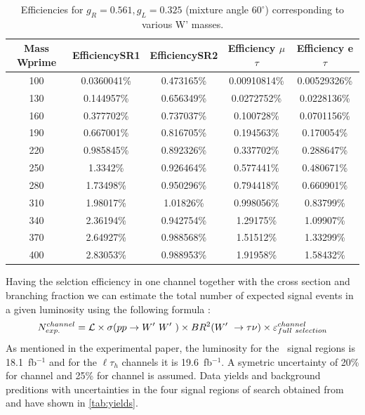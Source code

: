  \begin{table}[htb]
 	\centering
  	\begin{tabular}{|ccccc|}
  		\hline 
  		Mass Wprime & EfficiencySR1 & EfficiencySR2 & Efficiency $\mu$$\tau$ & Efficiency e $\tau$ \\
\hline 
  		100&0.0360041\%&0.473165\%&0.00910814\%&0.00529326\%\\
        	130& 0.144957\%& 0.656349\%&0.0272752\%& 0.0228136\%\\
        	160&0.377702\%&0.737037\%&0.100728\%&0.0701156\%\\
          	190& 0.667001\%& 0.816705\%& 0.194563\%& 0.170054\%\\
                220&0.985845\%&0.892326\%&0.337702\%&0.288647\%\\
                250&1.3342\%&0.926464\%&0.577441\%&0.480671\%\\ 
          	280& 1.73498\%& 0.950296\%& 0.794418\%& 0.660901\%\\
                310&1.98017\%&1.01826\%&0.998056\%&0.83799\%\\
                340& 2.36194\%& 0.942754\%& 1.29175\%& 1.09907\%\\ 
                370& 2.64927\%& 0.988568\%& 1.51512\%& 1.33299\%\\
        	400&2.83053\%&0.988953\%&1.91958\%&1.58432\%\\

  		\hline
  	\end{tabular}
  	\caption{Efficiencies for  $ g_R=0.561 , g_L=0.325$  (mixture angle $60^\circ$) corresponding to various W' masses. \label{eff-mix60} }
  \end{table}


 
Having the selction efficiency in one channel together with the cross section and branching fraction we can estimate the total number of expected signal events in a given luminosity using the following formula :
\begin{equation}
N^{channel}_{exp.}= \mathcal{L} \times \sigma(pp \to W^\prime~W^\prime~) \times BR^{2}(W^\prime~ \to \tau \nu) \times \varepsilon^{channel}_{full~selection}
\end{equation}
As mentioned in the experimental paper, the luminosity for the \tauTau ~signal regions is 18.1~fb$^{-1}$ and for the $\ell\tau_h$ channels it is 19.6~fb$^{-1}$. A symetric uncertainty of 20\% for \lepTau channel and 25\% for \tauTau channel is assumed. Data yields and background preditions with uncertainties in the four signal regions of search obtained from~\cite{Khachatryan:2016trj} and have shown in \ref{tab:yields}. 

